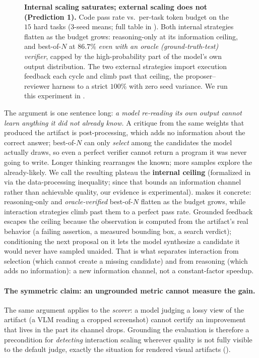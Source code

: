 \begin{figure}[t]
\caption{\textbf{Internal scaling saturates; external scaling does not (Prediction 1).} Code pass rate vs.\ per-task token budget on the $15$ hard tasks ($3$-seed means; full table in ). Both internal strategies flatten as the budget grows: reasoning-only at its information ceiling, and best-of-$N$ at $86.7\%$ \emph{even with an oracle (ground-truth-test) verifier}, capped by the high-probability part of the model's own output distribution. The two external strategies import execution feedback each cycle and climb past that ceiling, the proposer--reviewer harness to a strict $100\%$ with zero seed variance. We run this experiment in .}
\label{fig:scaling}
\end{figure}

The argument is one sentence long: \emph{a model re-reading its own output cannot learn anything it did not already know.} A critique from the same weights that produced the artifact is post-processing, which adds no information about the correct answer; best-of-$N$ can only \emph{select} among the candidates the model actually draws, so even a perfect verifier cannot return a program it was never going to write. Longer thinking rearranges the known; more samples explore the already-likely. We call the resulting plateau the \textbf{internal ceiling} (formalized in  via the data-processing inequality; since that bounds an information channel rather than achievable quality, our evidence is experimental).  makes it concrete: reasoning-only and \emph{oracle-verified} best-of-$N$ flatten as the budget grows, while interaction strategies climb past them to a perfect pass rate. Grounded feedback escapes the ceiling because the observation is computed from the artifact's real behavior (a failing assertion, a measured bounding box, a search verdict); conditioning the next proposal on it lets the model synthesize a candidate it would never have sampled unaided. That is what separates interaction from selection (which cannot create a missing candidate) and from reasoning (which adds no information): a new information channel, not a constant-factor speedup.

\paragraph{The symmetric claim: an ungrounded metric cannot measure the gain.} The same argument applies to the \emph{scorer}: a model judging a lossy view of the artifact (a VLM reading a cropped screenshot) cannot certify an improvement that lives in the part its channel drops. Grounding the evaluation is therefore a precondition for \emph{detecting} interaction scaling wherever quality is not fully visible to the default judge, exactly the situation for rendered visual artifacts ().

